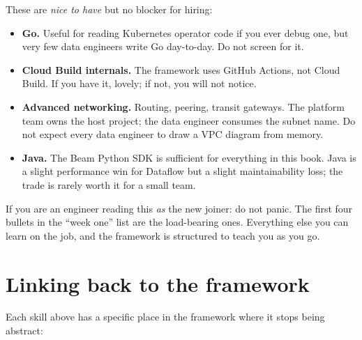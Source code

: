 \documentclass[
  11pt,
  british,
  oneside]{book}
\providecommand{\tightlist}{%
  \setlength{\itemsep}{0pt}\setlength{\parskip}{0pt}}
\begin{document}
These are \emph{nice to have} but no blocker for hiring:

\begin{itemize}
\tightlist
\item
  \textbf{Go.} Useful for reading Kubernetes operator code if you ever
  debug one, but very few data engineers write Go day-to-day. Do not
  screen for it.
\item
  \textbf{Cloud Build internals.} The framework uses GitHub Actions, not
  Cloud Build. If you have it, lovely; if not, you will not notice.
\item
  \textbf{Advanced networking.} Routing, peering, transit gateways. The
  platform team owns the host project; the data engineer consumes the
  subnet name. Do not expect every data engineer to draw a VPC diagram
  from memory.
\item
  \textbf{Java.} The Beam Python SDK is sufficient for everything in
  this book. Java is a slight performance win for Dataflow but a slight
  maintainability loss; the trade is rarely worth it for a small team.
\end{itemize}

If you are an engineer reading this \emph{as} the new joiner: do not
panic. The first four bullets in the ``week one'' list are the
load-bearing ones. Everything else you can learn on the job, and the
framework is structured to teach you as you go.

\hypertarget{linking-back-to-the-framework}{%
\section{Linking back to the
framework}\label{linking-back-to-the-framework}}

Each skill above has a specific place in the framework where it stops
being abstract:
\end{document}
